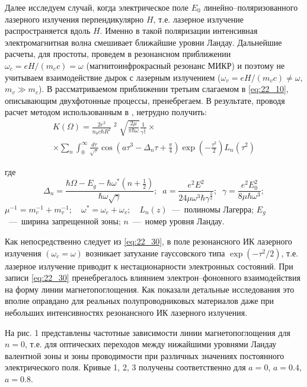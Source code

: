 {Далее исследуем случай, когда электрическое поле $E_{0} $ линейно--поляризованного лазерного излучения перпендикулярно $H$, т.е. лазерное излучение распространяется вдоль $H$. Именно в такой поляризации интенсивная электромагнитная волна смешивает ближайшие уровни Ландау. Дальнейшие расчеты, для простоты, проведем в резонансном приближении $\omega _{c} =eH/(m_{c} c)=\omega $ (магнитоинфрокрасный резонанс МИКР) и поэтому не учитываем взаимодействие дырок с лазерным излучением ($\omega _{v} =eH/(m_{v} c)\ne \omega $, $m_{v} \gg m_{c} $). В рассматриваемом приближении третьим слагаемом в \eqref{eq:22_10}, описывающим двухфотонные процессы, пренебрегаем. В результате, проводя расчет методом использованным в \cite{Sinyavskii1974,Sinyavskii2002}, нетрудно получить: 
\begin{multline} \label{eq:22_30} 
K(\Omega )=\frac{2e^{2} }{n_{0} c\hbar R^{2} } \mathop{\left|\frac{p_{cv} \xi _{0} }{m_{0} } \right|}\nolimits^{2} \sqrt{\frac{2\mu }{\pi \hbar \omega } } \frac{1}{\gamma ^{{\tfrac{1}{4}} } } \times \\
\times \sum _{n} \int _{0}^{\infty } \frac{d\tau }{\sqrt{\tau } } \cos \left(a\tau ^{3} -\Delta _{n} \tau +\frac{\pi }{4} \right)\exp \left(-\frac{\tau ^{2} }{2} \right)L_{n} (\tau ^{2} )
\end{multline} 

где 
\[
\Delta _{n} =\frac{\hbar \Omega -E_{g} -\hbar \omega ^{*} \left(n+{\tfrac{1}{2}} \right)}{\hbar \omega \sqrt{\gamma } } ;\; \; a=\frac{e^{2} E^{2} }{24\mu \omega ^{3} \hbar \gamma ^{{\tfrac{3}{2}} } } ;\; \; \gamma =\frac{e^{2} E_{0}^{2} }{8\mu \hbar \omega ^{3} } ;
\] 
$\mu ^{-1} =m_{c}^{-1} +m_{v}^{-1} ;$~~$\omega ^{*} =\omega _{c} +\omega _{v} ;$~~$L_{n} (z)$~---~полиномы Лагерра; $E_{g} $~---~ширина запрещенной зоны; $n$~---~номер уровня Ландау. 

\noindent Как непосредственно следует из \eqref{eq:22_30}, в поле резонансного ИК лазерного излучения $(\omega _{c} =\omega )$ возникает затухание гауссовского типа $\exp \left(-\tau ^{2} /2\right)$, т.е. лазерное излучение приводит к нестационарности электронных состояний. При записи \eqref{eq:22_30} пренебрегалось влиянием электрон--фононного взаимодействия на форму линии магнетопоглощения. Как показали детальные исследования \cite{Sinyavskii1976} это вполне оправдано для реальных полупроводниковых материалов даже при небольших интенсивностях резонансного ИК лазерного излучения. 

На рис. 1 представлены частотные зависимости линии магнетопоглощения для $n=0$, т.е. для оптических переходов между нижайшими уровнями Ландау валентной зоны и зоны проводимости при различных значениях постоянного электрического поля. Кривые 1, 2, 3 получены соответственно для $a=0$, $a=0.4$, $a=0.8$.

}
